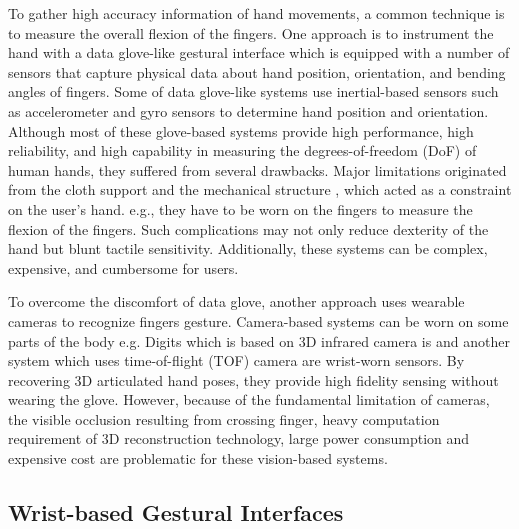 \documentclass{sigchi}
\begin{document}


To gather high accuracy information of hand movements, a common technique is to measure the overall flexion of the fingers. One approach is to instrument the hand with a data glove-like gestural interface \cite{4539650} which is equipped with a number of sensors that capture physical data about hand position, orientation, and bending angles of fingers. Some of data glove-like systems use inertial-based sensors such as accelerometer and gyro sensors to determine hand position and orientation.%
Although most of these glove-based systems provide high performance, high reliability, and high capability in measuring the degrees-of-freedom (DoF) of human hands, they suffered from several drawbacks.%
Major limitations originated from the cloth support and the mechanical structure%
, which acted as a constraint on the user’s hand. e.g., they have to be worn on the fingers to measure the flexion of the fingers. Such complications may not only reduce dexterity of the hand but blunt tactile sensitivity. Additionally, these systems can be complex, expensive, and cumbersome for users.

To overcome the discomfort of data glove, another approach uses wearable cameras to recognize fingers gesture. Camera-based systems can be worn on some parts of the body e.g. Digits \cite{Kim:2012:DFI:2380116.2380139} which is based on 3D infrared camera is and another system \cite{6855631} which uses time-of-flight (TOF) camera are wrist-worn sensors. By recovering 3D articulated hand poses, they provide high fidelity sensing without wearing the glove. However, because of the fundamental limitation of cameras, the visible occlusion resulting from crossing finger, heavy computation requirement of 3D reconstruction technology, large power consumption and expensive cost are problematic for these vision-based systems.

\subsection{Wrist-based Gestural Interfaces}
\end{document}
